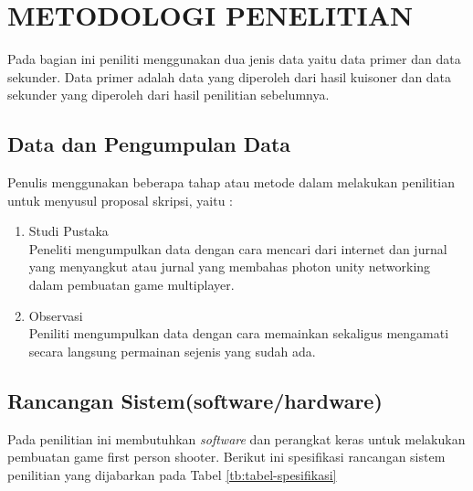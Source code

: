 \chapter{METODOLOGI PENELITIAN}
Pada bagian ini peniliti menggunakan dua jenis data yaitu data primer dan data sekunder. Data primer adalah data yang diperoleh dari hasil kuisoner dan data sekunder yang diperoleh dari hasil penilitian sebelumnya.

\section{Data dan Pengumpulan Data}
Penulis menggunakan beberapa tahap atau metode dalam melakukan penilitian untuk menyusul proposal skripsi, yaitu :

\begin{enumerate}
    \item Studi Pustaka \\ Peneliti mengumpulkan data dengan cara mencari dari internet dan jurnal yang menyangkut atau jurnal yang membahas photon unity networking dalam pembuatan game multiplayer.
    \item Observasi \\ Peniliti mengumpulkan data dengan cara memainkan sekaligus mengamati secara langsung permainan sejenis yang sudah ada.
\end{enumerate}

\section{Rancangan Sistem(software/hardware)}
    Pada penilitian ini membutuhkan \textit{software} dan perangkat keras untuk melakukan pembuatan game first person shooter. Berikut ini spesifikasi rancangan sistem penilitian yang dijabarkan pada Tabel \ref{tb:tabel-spesifikasi}
    
